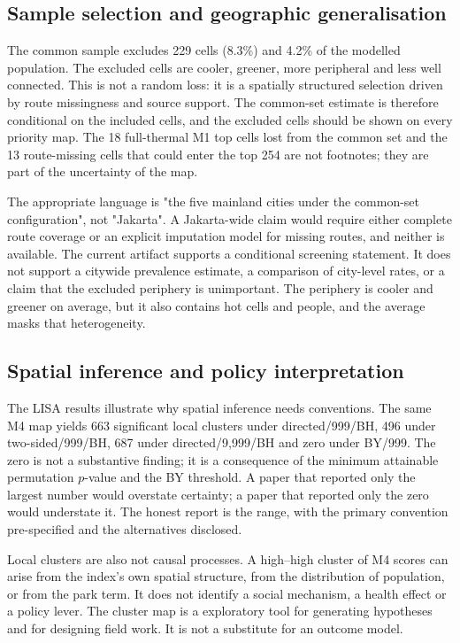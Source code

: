 \documentclass[times,twoside]{_Templates/MultiTargetManuscript}
\begin{document}
\subsection{Sample selection and geographic generalisation}

The common sample excludes 229 cells (8.3\%) and 4.2\% of the modelled
population. The excluded cells are cooler, greener, more peripheral and less
well connected. This is not a random loss: it is a spatially structured
selection driven by route missingness and source support. The common-set
estimate is therefore conditional on the included cells, and the excluded cells
should be shown on every priority map. The 18 full-thermal M1 top cells lost from
the common set and the 13 route-missing cells that could enter the top 254 are
not footnotes; they are part of the uncertainty of the map.

The appropriate language is "the five mainland cities under the common-set
configuration", not "Jakarta". A Jakarta-wide claim would require either
complete route coverage or an explicit imputation model for missing routes, and
neither is available. The current artifact supports a conditional screening
statement. It does not support a citywide prevalence estimate, a comparison of
city-level rates, or a claim that the excluded periphery is unimportant. The
periphery is cooler and greener on average, but it also contains hot cells and
people, and the average masks that heterogeneity.

\subsection{Spatial inference and policy interpretation}

The LISA results illustrate why spatial inference needs conventions. The same M4
map yields 663 significant local clusters under directed/999/BH, 496 under
two-sided/999/BH, 687 under directed/9,999/BH and zero under BY/999. The zero is
not a substantive finding; it is a consequence of the minimum attainable
permutation $p$-value and the BY threshold. A paper that reported only the
largest number would overstate certainty; a paper that reported only the zero
would understate it. The honest report is the range, with the primary convention
pre-specified and the alternatives disclosed.

Local clusters are also not causal processes. A high--high cluster of M4 scores
can arise from the index's own spatial structure, from the distribution of
population, or from the park term. It does not identify a social mechanism, a
health effect or a policy lever. The cluster map is a exploratory tool for
generating hypotheses and for designing field work. It is not a substitute for
an outcome model.
\end{document}
